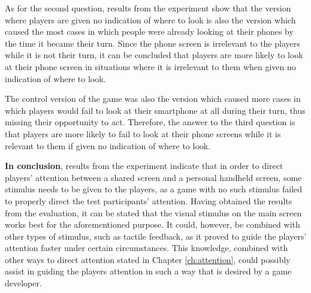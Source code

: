 As for the second question, results from the experiment show that the version where players are given no indication of where to look is also the version which caused the most cases in which people were already looking at their phones by the time it became their turn. Since the phone screen is irrelevant to the players while it is not their turn, it can be concluded that players are more likely to look at their phone screen in situations where it is irrelevant to them when given no indication of where to look.

The control version of the game was also the version which caused more cases in which players would fail to look at their smartphone at all during their turn, thus missing their opportunity to act. Therefore, the answer to the third question is that players are more likely to fail to look at their phone screens while it is relevant to them if given no indication of where to look.

\textbf{In conclusion}, results from the experiment indicate that in order to direct players’ attention between a shared screen and a personal handheld screen, some stimulus needs to be given to the players, as a game with no such stimulus failed to properly direct the test participants’ attention. Having obtained the results from the evaluation, it can be stated that the visual stimulus on the main screen works best for the aforementioned purpose. It could, however, be combined with other types of stimulus, such as tactile feedback, as it proved to guide the players’ attention faster under certain circumstances. This knowledge, combined with other ways to direct attention stated in Chapter \ref{ch:attention}, could possibly assist in guiding the players attention in such a way that is desired by a game developer.
